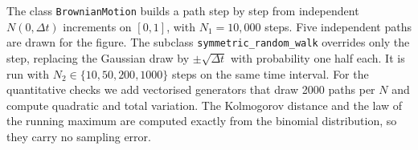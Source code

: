 The class \texttt{BrownianMotion} builds a path step by step from independent $N(0,\Delta t)$ increments on $[0,1]$, with $N_1=10{,}000$ steps.
Five independent paths are drawn for the figure.
The subclass \texttt{symmetric\_random\_walk} overrides only the step, replacing the Gaussian draw by $\pm\sqrt{\Delta t}$ with probability one half each.
It is run with $N_2\in\{10,50,200,1000\}$ steps on the same time interval.
For the quantitative checks we add vectorised generators that draw 2000 paths per $N$ and compute quadratic and total variation.
The Kolmogorov distance and the law of the running maximum are computed exactly from the binomial distribution, so they carry no sampling error.
